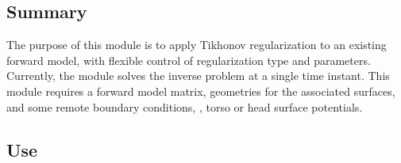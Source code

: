
\newcommand{\x}{\times}


\subsection{Summary}

The purpose of this module is to apply Tikhonov regularization to an
existing forward model, with flexible control of regularization type and
parameters.  Currently, the module solves the inverse problem at a single
time instant.  This module requires a forward model matrix, geometries for
the associated surfaces, and some remote boundary conditions, \ie{}, torso or
head surface potentials.


\subsection{Use}

